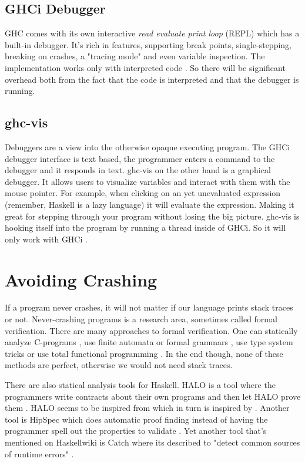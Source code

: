 \subsection{GHCi Debugger}

GHC comes with its own interactive \emph{read evaluate print loop} (REPL)
which has a built-in debugger. It's rich in features, supporting break
points, single-stepping, breaking on crashes, a "tracing mode" and even
variable inspection. The implementation works only with interpreted
code \cite{marlow2007lightweight, ghci_debugger}. So there will be significant overhead both
from the fact that the code is interpreted and that the debugger is
running.


\subsection{ghc-vis}

Debuggers are a view into the otherwise opaque executing program. The
GHCi debugger interface is text based, the programmer enters a command
to the debugger and it responds in text.  ghc-vis on the other hand is a
graphical debugger.  It allows users to visualize variables and interact
with them with the mouse pointer. For example, when clicking on an yet
unevaluated expression (remember, Haskell is a lazy language) it will
evaluate the expression.  Making it great for stepping through your
program without losing the big picture.  ghc-vis is hooking itself into
the program by running a thread inside of GHCi. So it will only work
with GHCi \cite{thesisFelsingBA}.

\section{Avoiding Crashing} \label{sec:avoiding_crashing}

If a program never crashes,
it will not matter if our language prints stack traces or not. Never-crashing programs is a research area, sometimes called formal
verification. There are many approaches to formal verification. One
can statically analyze C-programs \cite{ckl2004},
use finite automata
or formal grammars \cite{dantam2013motion, rouhani2013software},
use type system tricks \cite{cheney2003first}
or use total functional programming \cite{Turner:jucs_10_7:total_functional_programming}.
In the end though, none of these methods are perfect, otherwise we
would not need stack traces.

There are also statical analysis tools for Haskell. HALO is a tool
where the programmers write contracts about their own programs and
then let HALO prove them \cite{vytiniotis2013halo}. HALO seems to
be inspired from \cite{xu2009static} which in turn is inspired by
\cite{xu2006extended}. Another tool is HipSpec which does automatic
proof finding instead of having the programmer spell out the properties
to validate \cite{claessen2013automating}. Yet another tool that's
mentioned on Haskellwiki is Catch where its described to "detect common
sources of runtime errors" \cite{haskellwiki_static_analysis_tools}.

